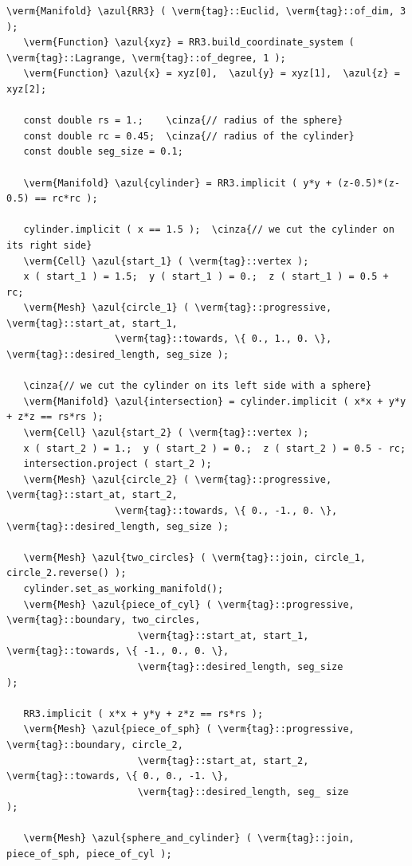 \begin{Verbatim}[commandchars=\\\{\},formatcom=\small\tt,frame=single,
   label=parag-\ref{\numb section 3.\numb parag 18}.cpp,rulecolor=\color{coment},
   baselinestretch=0.94,framesep=2mm                                            ]
   \verm{Manifold} \azul{RR3} ( \verm{tag}::Euclid, \verm{tag}::of_dim, 3 );
   \verm{Function} \azul{xyz} = RR3.build_coordinate_system ( \verm{tag}::Lagrange, \verm{tag}::of_degree, 1 );
   \verm{Function} \azul{x} = xyz[0],  \azul{y} = xyz[1],  \azul{z} = xyz[2];

   const double rs = 1.;    \cinza{// radius of the sphere}
   const double rc = 0.45;  \cinza{// radius of the cylinder}
   const double seg_size = 0.1;

   \verm{Manifold} \azul{cylinder} = RR3.implicit ( y*y + (z-0.5)*(z-0.5) == rc*rc );

   cylinder.implicit ( x == 1.5 );  \cinza{// we cut the cylinder on its right side}
   \verm{Cell} \azul{start_1} ( \verm{tag}::vertex );
   x ( start_1 ) = 1.5;  y ( start_1 ) = 0.;  z ( start_1 ) = 0.5 + rc;
   \verm{Mesh} \azul{circle_1} ( \verm{tag}::progressive, \verm{tag}::start_at, start_1,
                   \verm{tag}::towards, \{ 0., 1., 0. \}, \verm{tag}::desired_length, seg_size );

   \cinza{// we cut the cylinder on its left side with a sphere}
   \verm{Manifold} \azul{intersection} = cylinder.implicit ( x*x + y*y + z*z == rs*rs );
   \verm{Cell} \azul{start_2} ( \verm{tag}::vertex );
   x ( start_2 ) = 1.;  y ( start_2 ) = 0.;  z ( start_2 ) = 0.5 - rc;
   intersection.project ( start_2 );
   \verm{Mesh} \azul{circle_2} ( \verm{tag}::progressive, \verm{tag}::start_at, start_2,
                   \verm{tag}::towards, \{ 0., -1., 0. \}, \verm{tag}::desired_length, seg_size );

   \verm{Mesh} \azul{two_circles} ( \verm{tag}::join, circle_1, circle_2.reverse() );
   cylinder.set_as_working_manifold();
   \verm{Mesh} \azul{piece_of_cyl} ( \verm{tag}::progressive, \verm{tag}::boundary, two_circles,
                       \verm{tag}::start_at, start_1, \verm{tag}::towards, \{ -1., 0., 0. \},
                       \verm{tag}::desired_length, seg_size                          );

   RR3.implicit ( x*x + y*y + z*z == rs*rs );
   \verm{Mesh} \azul{piece_of_sph} ( \verm{tag}::progressive, \verm{tag}::boundary, circle_2,
                       \verm{tag}::start_at, start_2, \verm{tag}::towards, \{ 0., 0., -1. \},
                       \verm{tag}::desired_length, seg_ size                         );
                       
   \verm{Mesh} \azul{sphere_and_cylinder} ( \verm{tag}::join, piece_of_sph, piece_of_cyl );
\end{Verbatim}

